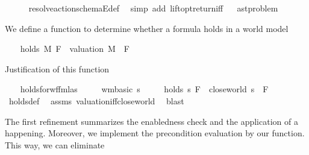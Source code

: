 \begin{isabellebody}
%
\isadelimproof
\ \ \ \ %
\endisadelimproof
%
\isatagproof
{}\isamarkupfalse%
\ resolve{\isacharunderscore}{\kern0pt}action{\isacharunderscore}{\kern0pt}schemaE{\isacharunderscore}{\kern0pt}def\ \isamarkupfalse%
\ {\isacharparenleft}{\kern0pt}simp\ add{\isacharcolon}{\kern0pt}\ lift{\isacharunderscore}{\kern0pt}opt{\isacharunderscore}{\kern0pt}return{\isacharunderscore}{\kern0pt}iff{\isacharparenright}{\kern0pt}%
\endisatagproof
{\isafoldproof}%
%
\isadelimproof
\isanewline
%
\endisadelimproof
\isanewline
{}\isamarkupfalse%
\ %
\isanewline
\isanewline
{}\isamarkupfalse%
\ ast{\isacharunderscore}{\kern0pt}problem\ %
\begin{isamarkuptext}%
We define a function to determine whether a formula holds in
    a world model%
\end{isamarkuptext}\isamarkuptrue%
\ \ \isamarkupfalse%
\ {\isachardoublequoteopen}holds\ M\ F\ {\isasymequiv}\ {\isacharparenleft}{\kern0pt}valuation\ M{\isacharparenright}{\kern0pt}\ {\isasymTurnstile}\ F{\isachardoublequoteclose}%
\begin{isamarkuptext}%
Justification of this function%
\end{isamarkuptext}\isamarkuptrue%
\ \ \isamarkupfalse%
\ holds{\isacharunderscore}{\kern0pt}for{\isacharunderscore}{\kern0pt}wf{\isacharunderscore}{\kern0pt}fmlas{\isacharcolon}{\kern0pt}\isanewline
\ \ \ \ \ {\isachardoublequoteopen}wm{\isacharunderscore}{\kern0pt}basic\ s{\isachardoublequoteclose}\isanewline
\ \ \ \ \ {\isachardoublequoteopen}holds\ s\ F\ {\isasymlongleftrightarrow}\ close{\isacharunderscore}{\kern0pt}world\ s\ {\isasymTTurnstile}\ F{\isachardoublequoteclose}\isanewline
%
\isadelimproof
\ \ \ \ %
\endisadelimproof
%
\isatagproof
{}\isamarkupfalse%
\ holds{\isacharunderscore}{\kern0pt}def\ \isamarkupfalse%
\ assms\ valuation{\isacharunderscore}{\kern0pt}iff{\isacharunderscore}{\kern0pt}close{\isacharunderscore}{\kern0pt}world\ \isamarkupfalse%
\ blast%
\endisatagproof
{\isafoldproof}%
%
\isadelimproof
%
\endisadelimproof
%
\begin{isamarkuptext}%
The first refinement summarizes the enabledness check and the 
    application of a happening. Moreover, we implement the precondition 
    evaluation by our  function. This way, we can eliminate 

\end{isamarkuptext}
\end{isabellebody}
